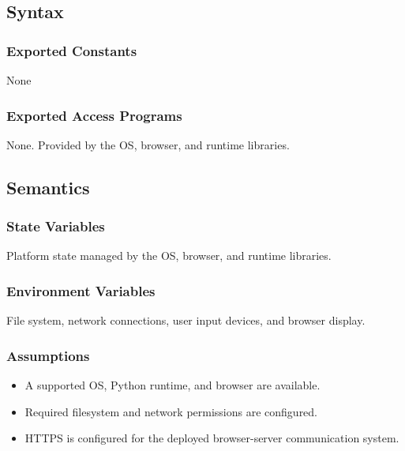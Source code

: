 \documentclass[12pt, titlepage]{article}
\begin{document}
\subsection{Syntax}

\subsubsection{Exported Constants}
None

\subsubsection{Exported Access Programs}
None. Provided by the OS, browser, and runtime libraries.

\subsection{Semantics}

\subsubsection{State Variables}

Platform state managed by the OS, browser, and runtime libraries.

\subsubsection{Environment Variables}

File system, network connections, user input devices, and browser display.

\subsubsection{Assumptions}


\begin{itemize}
  \item A supported OS, Python runtime, and browser are available.
  \item Required filesystem and network permissions are configured.
  \item HTTPS is configured for the deployed browser-server communication system. 
\end{itemize}
\end{document}
